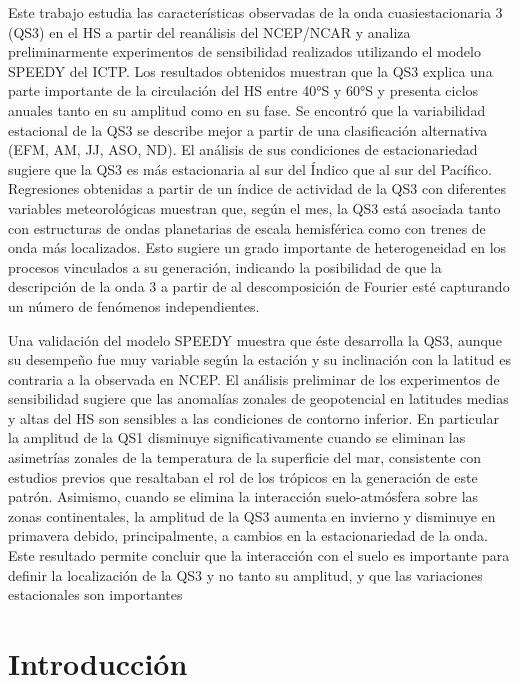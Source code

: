 \documentclass[spanish,a4paper,12pt,oneside]{book}
\begin{document}
Este trabajo estudia las características observadas de la onda
cuasiestacionaria 3 (QS3) en el HS a partir del reanálisis del NCEP/NCAR
y analiza preliminarmente experimentos de sensibilidad realizados
utilizando el modelo SPEEDY del ICTP. Los resultados obtenidos muestran
que la QS3 explica una parte importante de la circulación del HS entre
40°S y 60°S y presenta ciclos anuales tanto en su amplitud como en su
fase. Se encontró que la variabilidad estacional de la QS3 se describe
mejor a partir de una clasificación alternativa (EFM, AM, JJ, ASO, ND).
El análisis de sus condiciones de estacionariedad sugiere que la QS3 es
más estacionaria al sur del Índico que al sur del Pacífico. Regresiones
obtenidas a partir de un índice de actividad de la QS3 con diferentes
variables meteorológicas muestran que, según el mes, la QS3 está
asociada tanto con estructuras de ondas planetarias de escala
hemisférica como con trenes de onda más localizados. Esto sugiere un
grado importante de heterogeneidad en los procesos vinculados a su
generación, indicando la posibilidad de que la descripción de la onda 3
a partir de al descomposición de Fourier esté capturando un número de
fenómenos independientes.

Una validación del modelo SPEEDY muestra que éste desarrolla la QS3,
aunque su desempeño fue muy variable según la estación y su inclinación
con la latitud es contraria a la observada en NCEP. El análisis
preliminar de los experimentos de sensibilidad sugiere que las anomalías
zonales de geopotencial en latitudes medias y altas del HS son sensibles
a las condiciones de contorno inferior. En particular la amplitud de la
QS1 disminuye significativamente cuando se eliminan las asimetrías
zonales de la temperatura de la superficie del mar, consistente con
estudios previos que resaltaban el rol de los trópicos en la generación
de este patrón. Asimismo, cuando se elimina la interacción
suelo-atmósfera sobre las zonas continentales, la amplitud de la QS3
aumenta en invierno y disminuye en primavera debido, principalmente, a
cambios en la estacionariedad de la onda. Este resultado permite
concluir que la interacción con el suelo es importante para definir la
localización de la QS3 y no tanto su amplitud, y que las variaciones
estacionales son importantes

\restoregeometry
\setcounter{tocdepth}{3} \tableofcontents

\listoffigures
\newpage

\mainmatter

\chapter{Introducción}\label{introduccion}
\end{document}
